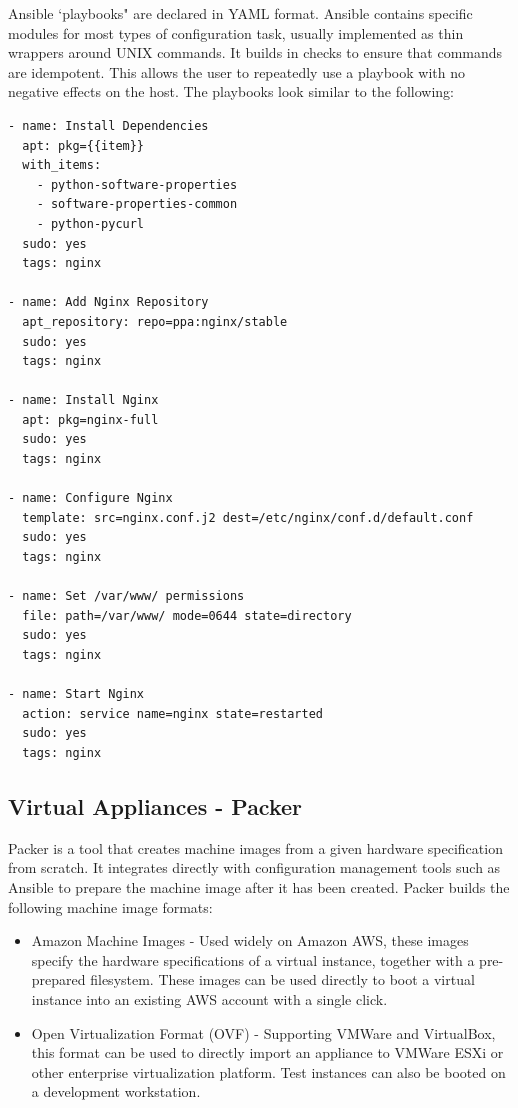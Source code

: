 \documentclass{cshonours}
\begin{document}
Ansible `playbooks" are declared in YAML format. Ansible contains specific modules for most types of configuration task, usually implemented as thin wrappers around UNIX commands. It builds in checks to ensure that commands are idempotent. This allows the user to repeatedly use a playbook with no negative effects on the host. The playbooks look similar to the following:

\begin{listing}[p]
\begin{verbatim}
- name: Install Dependencies
  apt: pkg={{item}}
  with_items:
    - python-software-properties
    - software-properties-common
    - python-pycurl
  sudo: yes
  tags: nginx

- name: Add Nginx Repository
  apt_repository: repo=ppa:nginx/stable
  sudo: yes
  tags: nginx

- name: Install Nginx
  apt: pkg=nginx-full
  sudo: yes
  tags: nginx

- name: Configure Nginx
  template: src=nginx.conf.j2 dest=/etc/nginx/conf.d/default.conf
  sudo: yes
  tags: nginx

- name: Set /var/www/ permissions
  file: path=/var/www/ mode=0644 state=directory
  sudo: yes
  tags: nginx

- name: Start Nginx
  action: service name=nginx state=restarted
  sudo: yes
  tags: nginx
\end{verbatim}
\end{listing}

\subsection{Virtual Appliances - Packer}

Packer is a tool that creates machine images from a given hardware specification from scratch. It integrates directly with configuration management tools such as Ansible to prepare the machine image after it has been created. Packer builds the following machine image formats:

\begin{itemize}
  \item Amazon Machine Images - Used widely on Amazon AWS, these images specify the hardware specifications of a virtual instance, together with a pre-prepared filesystem. These images can be used directly to boot a virtual instance into an existing AWS account with a single click.
  \item Open Virtualization Format (OVF) - Supporting VMWare and VirtualBox, this format can be used to directly import an appliance to VMWare ESXi or other enterprise virtualization platform. Test instances can also be booted on a development workstation.
\end{itemize}
\end{document}
